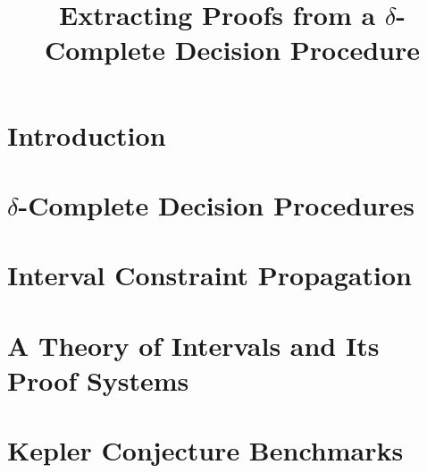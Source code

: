 \documentclass[envcountsect]{llncs}
\title{Extracting Proofs from a $\delta$-Complete Decision Procedure}
\author{}
\institute{Carnegie Mellon University, Pittsburgh, PA 15213}
\begin{document}
\maketitle

\begin{abstract}
\end{abstract}

\section{Introduction}

\section{$\delta$-Complete Decision Procedures}

\section{Interval Constraint Propagation}

\section{A Theory of Intervals and Its Proof Systems}

\section{Kepler Conjecture Benchmarks}






\end{document}
